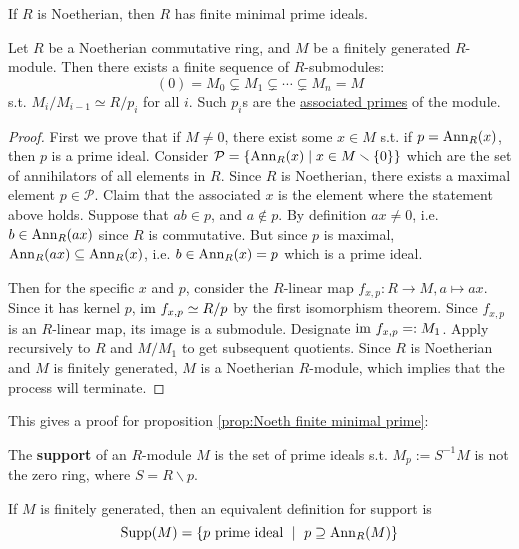 \begin{proposition}\label{prop:Noeth finite minimal prime}
    If $R$ is Noetherian, then $R$ has finite minimal prime ideals. 
\end{proposition}

\begin{theorem}\label{thm:associated prime}
    Let $R$ be a Noetherian commutative ring, and $M$ be a finitely generated $R$-module. Then there exists a finite sequence of $R$-submodules:
    \[
        (0) = M_0 \subsetneq M_1 \subsetneq \cdots \subsetneq M_n = M 
    \]
    s.t. $M_i / M_{i-1} \simeq R / p_i$ for all $i$. Such $p_i$s are the \underline{associated primes} of the module.
\end{theorem}

\begin{proof}
    First we prove that if $M\neq 0$, there exist some $x\in M$ s.t. if $p = \mathrm{Ann}_R(x)$, then $p$ is a prime ideal. Consider $\mathcal{P} = \{ \mathrm{Ann}_R(x) \mid x\in M\smallsetminus \{0\} \}$ which are the set of annihilators of all elements in $R$. Since $R$ is Noetherian, there exists a maximal element $p\in\mathcal{P}$. Claim that the associated $x$ is the element where the statement above holds. Suppose that $ab\in p$, and $a\notin p$. By definition $ax \neq 0$, i.e. $b\in \mathrm{Ann}_R(ax)$ since $R$ is commutative. But since $p$ is maximal, $\mathrm{Ann}_R(ax) \subseteq \mathrm{Ann}_R(x)$, i.e. $b\in \mathrm{Ann}_R(x) = p$ which is a prime ideal. 

    Then for the specific $x$ and $p$, consider the $R$-linear map $f_{x, p}: R\to M, a\mapsto ax$. Since it has kernel $p$, $\mathrm{im}\  f_{x, p} \simeq R/p$ by the first isomorphism theorem. Since $f_{x,p}$ is an $R$-linear map, its image is a submodule. Designate $\mathrm{im}\  f_{x, p} =: M_1$. Apply recursively to $R$ and $M/M_1$ to get subsequent quotients. Since $R$ is Noetherian and $M$ is finitely generated, $M$ is a Noetherian $R$-module, which implies that the process will terminate. 
\end{proof}

This gives a proof for proposition \ref{prop:Noeth finite minimal prime}:

\begin{definition}[Support]
    The \textbf{support} of an $R$-module $M$ is the set of prime ideals s.t. $M_p := S^{-1}M$ is not the zero ring, where $S = R \smallsetminus p$.
\end{definition}

\begin{remark}
    If $M$ is finitely generated, then an equivalent definition for support is
    \[
        \Supp (M) = \{ p \text{ prime ideal } \mid\ p\supseteq \Ann_R(M) \}
    \]
\end{remark}

